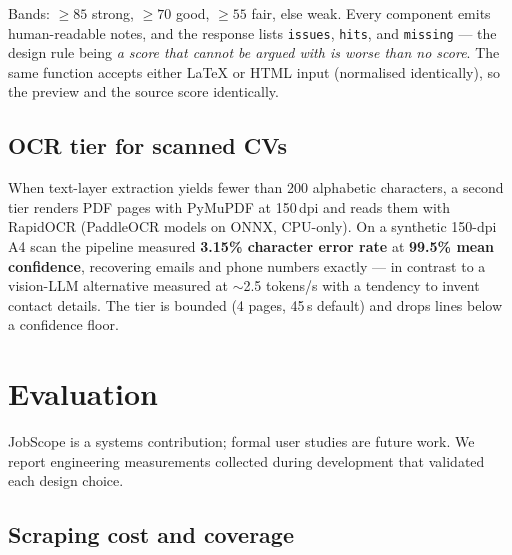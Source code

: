 \documentclass[11pt,a4paper]{article}
\newcommand{\code}[1]{\texttt{#1}}
\begin{document}
Bands: $\geq 85$ strong, $\geq 70$ good, $\geq 55$ fair, else weak. Every
component emits human-readable notes, and the response lists
\code{issues}, \code{hits}, and \code{missing} --- the design rule being
\emph{a score that cannot be argued with is worse than no score}. The same
function accepts either \LaTeX{} or HTML input (normalised identically), so
the preview and the source score identically.

\subsection{OCR tier for scanned CVs}
\label{sec:ocr}

When text-layer extraction yields fewer than 200 alphabetic characters, a
second tier renders PDF pages with PyMuPDF at 150\,dpi and reads them with
RapidOCR (PaddleOCR models on ONNX, CPU-only). On a synthetic 150-dpi A4
scan the pipeline measured \textbf{3.15\% character error rate} at
\textbf{99.5\% mean confidence}, recovering emails and phone numbers
exactly --- in contrast to a vision-LLM alternative measured at
$\sim$2.5 tokens/s with a tendency to invent contact details. The tier is
bounded (4 pages, 45\,s default) and drops lines below a confidence floor.

\section{Evaluation}
\label{sec:evaluation}

JobScope is a systems contribution; formal user studies are future work.
We report engineering measurements collected during development that
validated each design choice.

\subsection{Scraping cost and coverage}
\label{sec:eval-scrape}
\end{document}
